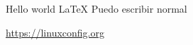 \documentclass{article}
\begin{document}
Hello world \LaTeX  
Puedo escribir normal

\url{https://linuxconfig.org}
\end{document}
